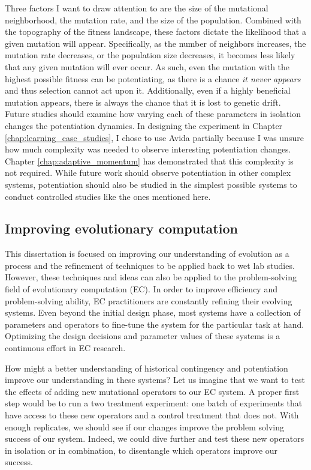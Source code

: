 Three factors I want to draw attention to are the size of the mutational neighborhood, the mutation rate, and the size of the population.
Combined with the topography of the fitness landscape, these factors dictate the likelihood that a given mutation will appear. 
Specifically, as the number of neighbors increases, the mutation rate decreases, or the population size decreases, it becomes less likely that any given mutation will ever occur. 
As such, even the mutation with the highest possible fitness can be potentiating, as there is a chance \textit{it never appears} and thus selection cannot act upon it.
Additionally, even if a highly beneficial mutation appears, there is always the chance that it is lost to genetic drift.
Future studies should examine how varying each of these parameters in isolation changes the potentiation dynamics. 
In designing the experiment in Chapter \ref{chap:learning_case_studies}, I chose to use Avida partially because I was unsure how much complexity was needed to observe interesting potentiation changes. 
Chapter \ref{chap:adaptive_momentum} has demonstrated that this complexity is not required. 
While future work should observe potentiation in other complex systems, potentiation should also be studied in the simplest possible systems to conduct controlled studies like the ones mentioned here. 


\subsection{Improving evolutionary computation}

This dissertation is focused on improving our understanding of evolution as a process and the refinement of techniques to be applied back to wet lab studies. 
However, these techniques and ideas can also be applied to the problem-solving field of evolutionary computation (EC).
In order to improve efficiency and problem-solving ability, EC practitioners are constantly refining their evolving systems. 
Even beyond the initial design phase, most systems have a collection of parameters and operators to fine-tune the system for the particular task at hand. 
Optimizing the design decisions and parameter values of these systems is a continuous effort in EC research. 

How might a better understanding of historical contingency and potentiation improve our understanding in these systems? 
Let us imagine that we want to test the effects of adding new mutational operators to our EC system. 
A proper first step would be to run a two treatment experiment: one batch of experiments that have access to these new operators and a control treatment that does not. 
With enough replicates, we should see if our changes improve the problem solving success of our system. 
Indeed, we could dive further and test these new operators in isolation or in combination, to disentangle which operators improve our success. 

